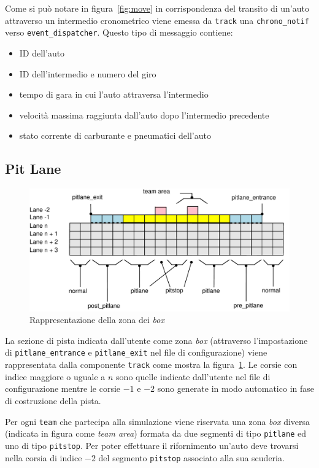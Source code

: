 \documentclass[11pt,a4paper]{report}
\begin{document}
Come si può notare in figura~\ref{fig:move} in corrispondenza del transito di un'auto attraverso un intermedio cronometrico viene emessa da \texttt{track} una \texttt{chrono\_notif} verso \texttt{event\_dispatcher}. Questo tipo di messaggio contiene:
\begin{itemize}
\item ID dell'auto
\item ID dell'intermedio e numero del giro
\item tempo di gara in cui l'auto attraversa l'intermedio
\item velocità massima raggiunta dall'auto dopo l'intermedio precedente
\item stato corrente di carburante e pneumatici dell'auto
\end{itemize}

\subsection{Pit Lane}
\begin{figure}
\includegraphics[width=\textwidth]{diagrammi/PitLane}
\caption{Rappresentazione della zona dei \textit{box}}
\label{fig:pitLane}
\end{figure}

La sezione di pista indicata dall'utente come zona \textit{box} (attraverso l'impostazione di \texttt{pitlane\_entrance} e \texttt{pitlane\_exit} nel file di configurazione) viene rappresentata dalla componente \texttt{track} come mostra la figura~\ref{fig:pitLane}. Le corsie con indice maggiore o uguale a $n$ sono quelle indicate dall'utente nel file di configurazione mentre le corsie $-1$ e $-2$ sono generate in modo automatico in fase di costruzione della pista.

Per ogni \texttt{team} che partecipa alla simulazione viene riservata una zona \textit{box} diversa (indicata in figura come \textit{team area}) formata da due segmenti di tipo \texttt{pitlane} ed uno di tipo \texttt{pitstop}. Per poter effettuare il rifornimento un'auto deve trovarsi nella corsia di indice $-2$ del segmento \texttt{pitstop} associato alla sua scuderia.
\end{document}
